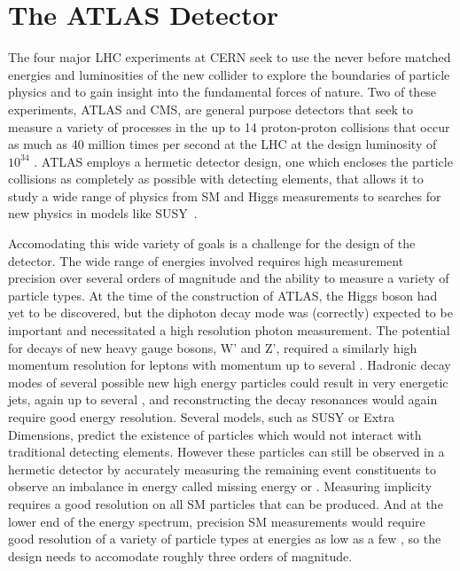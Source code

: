 \chapter{The ATLAS Detector}

\label{ch:atlas}

The four major \ac{LHC} experiments at \ac{CERN} seek to use the never before matched energies and luminosities of the new collider to explore the boundaries of particle physics and to gain insight into the fundamental forces of nature.
Two of these experiments, \ac{ATLAS} and \ac{CMS}, are general purpose detectors that seek to measure a variety of processes in the up to 14 \TeV proton-proton collisions that occur as much as 40 million times per second at the \ac{LHC} at the design luminosity of $10^{34}$ \lcms. 
\ac{ATLAS} employs a hermetic detector design, one which encloses the particle collisions as completely as possible with detecting elements, that allows it to study a wide range of physics from \ac{SM} and Higgs measurements to searches for new physics in models like \acl{SUSY}~\cite{atlas_experiment}.

Accomodating this wide variety of goals is a challenge for the design of the detector.
The wide range of energies involved requires high measurement precision over several orders of magnitude and the ability to measure a variety of particle types.
At the time of the construction of \ac{ATLAS}, the Higgs boson had yet to be discovered, but the diphoton decay mode was (correctly) expected to be important and necessitated a high resolution photon measurement.
The potential for decays of new heavy gauge bosons, W' and Z', required a similarly high momentum resolution for leptons with momentum up to several \TeV.
Hadronic decay modes of several possible new high energy particles could result in very energetic jets, again up to several \TeV, and reconstructing the decay resonances would again require good energy resolution.
Several models, such as \ac{SUSY} or Extra Dimensions, predict the existence of particles which would not interact with traditional detecting elements. 
However these particles can still be observed in a hermetic detector by accurately measuring the remaining event constituents to observe an imbalance in energy called missing energy or \met. 
Measuring \met implicity requires a good resolution on all \ac{SM} particles that can be produced.
And at the lower end of the energy spectrum, precision \ac{SM} measurements would require good resolution of a variety of particle types at energies as low as a few \GeV, so the design needs to accomodate roughly three orders of magnitude.


